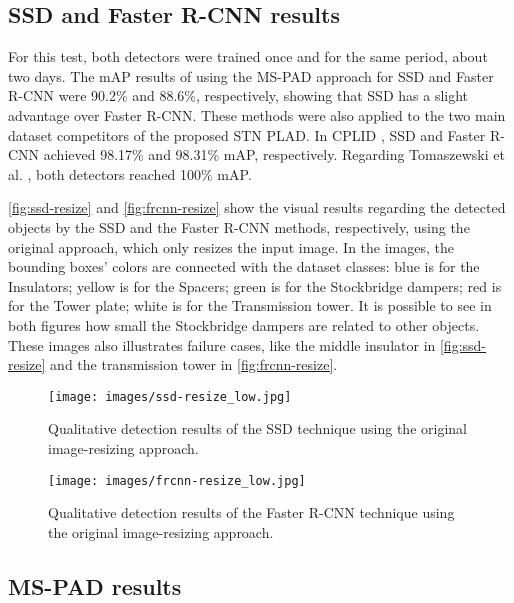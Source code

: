 \documentclass[10pt,conference]{IEEEtran}
\begin{document}
\subsection{SSD and Faster R-CNN results}
\label{sec:comparison}



For this test, both detectors were trained once and for the same period, about two days. The mAP results of using the MS-PAD approach for SSD and Faster R-CNN were 90.2\% and 88.6\%, respectively, showing that SSD has a slight advantage over Faster R-CNN. These methods were also applied to the two main dataset competitors of the proposed STN PLAD. In CPLID \cite{tao2018cplid}, SSD and Faster R-CNN achieved 98.17\% and 98.31\% mAP, respectively. Regarding Tomaszewski et al. \cite{tomaszewski2018collection}, both detectors reached 100\% mAP.

\autoref{fig:ssd-resize} and \autoref{fig:frcnn-resize} show the visual results regarding the detected objects by the SSD and the Faster R-CNN methods, respectively, using the original approach, which only resizes the input image. In the images, the bounding boxes' colors are connected with the dataset classes: blue is for the Insulators; yellow is for the Spacers; green is for the Stockbridge dampers; red is for the Tower plate; white is for the Transmission tower. It is possible to see in both figures how small the Stockbridge dampers are related to other objects. These images also illustrates failure cases, like the middle insulator in \autoref{fig:ssd-resize} and the transmission tower in \autoref{fig:frcnn-resize}.

\begin{figure}
    \centering
    \texttt{[image: images/ssd-resize\_low.jpg]}
    \caption{Qualitative detection results of the SSD technique using the original image-resizing approach.}
    \label{fig:ssd-resize}
\end{figure}

\begin{figure}
    \centering
    \texttt{[image: images/frcnn-resize\_low.jpg]}
    \caption{Qualitative detection results of the Faster R-CNN technique using the original image-resizing approach.}
    \label{fig:frcnn-resize}
\end{figure}

\subsection{MS-PAD results}
\label{sec:mspad-comparison}
\end{document}
